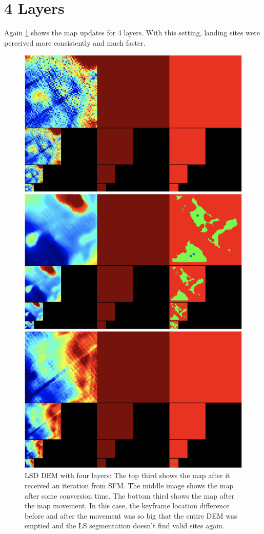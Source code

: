 \section{4 Layers}

Again \cref{fig:4_layers} shows the map updates for 4 layers. With this setting, landing sites were perceived more consistently and much faster.

\begin{figure}[h]
\centering
\includegraphics[scale=0.5]{images/appendix/layers/4.png}
\caption{LSD DEM with four layers: The top third shows the map after it received an iteration from SFM. The middle image shows the map after some conversion time. The bottom third shows the map after the map movement. In this case, the keyframe location difference before and after the movement was so big that the entire DEM was emptied and the LS segmentation doesn't find valid sites again.}
\label{fig:4_layers}
\end{figure}